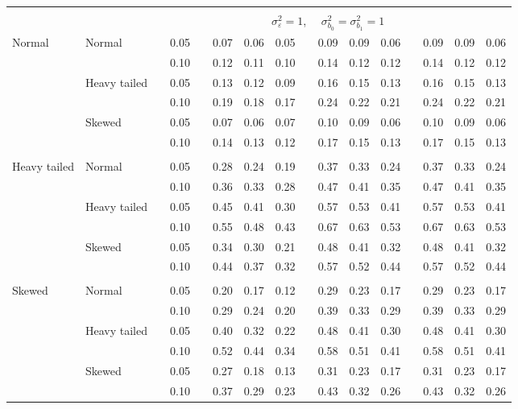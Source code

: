 \documentclass[11pt]{article} %
\begin{document}
\begin{table}[ht]
\begin{scriptsize}
\begin{center}
\begin{tabular}{ll p{.1cm} c p{.1cm} rrr p{.1cm} rrr p{.1cm} rrr}
&&&&&&&&&&&&&&&\\
& && && \multicolumn{9}{c}{$\sigma_{\varepsilon}^2 = 1$, \ \ $\sigma_{b_0}^2 = \sigma_{b_1}^2 = 1$} \\ \cline{6-16}
Normal       & Normal       && 0.05 &&  0.07 & 0.06 & 0.05 && 0.09 & 0.09 & 0.06 && 0.09 & 0.09 & 0.06 \\ 
             &              && 0.10 &&  0.12 & 0.11 & 0.10 && 0.14 & 0.12 & 0.12 && 0.14 & 0.12 & 0.12 \\ 
             & Heavy tailed && 0.05 &&  0.13 & 0.12 & 0.09 && 0.16 & 0.15 & 0.13 && 0.16 & 0.15 & 0.13 \\ 
             &              && 0.10 &&  0.19 & 0.18 & 0.17 && 0.24 & 0.22 & 0.21 && 0.24 & 0.22 & 0.21 \\ 
             & Skewed       && 0.05 &&  0.07 & 0.06 & 0.07 && 0.10 & 0.09 & 0.06 && 0.10 & 0.09 & 0.06 \\ 
             &              && 0.10 &&  0.14 & 0.13 & 0.12 && 0.17 & 0.15 & 0.13 && 0.17 & 0.15 & 0.13 \\ 
             &&&&&&&&&&&&&&&\\
Heavy tailed & Normal       && 0.05 &&  0.28 & 0.24 & 0.19 && 0.37 & 0.33 & 0.24 && 0.37 & 0.33 & 0.24 \\ 
             &              && 0.10 &&  0.36 & 0.33 & 0.28 && 0.47 & 0.41 & 0.35 && 0.47 & 0.41 & 0.35 \\ 
             & Heavy tailed && 0.05 &&  0.45 & 0.41 & 0.30 && 0.57 & 0.53 & 0.41 && 0.57 & 0.53 & 0.41 \\ 
             &              && 0.10 &&  0.55 & 0.48 & 0.43 && 0.67 & 0.63 & 0.53 && 0.67 & 0.63 & 0.53 \\ 
             & Skewed       && 0.05 &&  0.34 & 0.30 & 0.21 && 0.48 & 0.41 & 0.32 && 0.48 & 0.41 & 0.32 \\ 
             &              && 0.10 &&  0.44 & 0.37 & 0.32 && 0.57 & 0.52 & 0.44 && 0.57 & 0.52 & 0.44 \\
             &&&&&&&&&&&&&&&\\ 
Skewed       & Normal       && 0.05 &&  0.20 & 0.17 & 0.12 && 0.29 & 0.23 & 0.17 && 0.29 & 0.23 & 0.17 \\ 
             &              && 0.10 &&  0.29 & 0.24 & 0.20 && 0.39 & 0.33 & 0.29 && 0.39 & 0.33 & 0.29 \\ 
             & Heavy tailed && 0.05 &&  0.40 & 0.32 & 0.22 && 0.48 & 0.41 & 0.30 && 0.48 & 0.41 & 0.30 \\ 
             &              && 0.10 &&  0.52 & 0.44 & 0.34 && 0.58 & 0.51 & 0.41 && 0.58 & 0.51 & 0.41 \\ 
             & Skewed       && 0.05 &&  0.27 & 0.18 & 0.13 && 0.31 & 0.23 & 0.17 && 0.31 & 0.23 & 0.17 \\ 
             &              && 0.10 &&  0.37 & 0.29 & 0.23 && 0.43 & 0.32 & 0.26 && 0.43 & 0.32 & 0.26 \\ 




\end{tabular}
\end{center}
\end{scriptsize}
\end{table}
\end{document}
